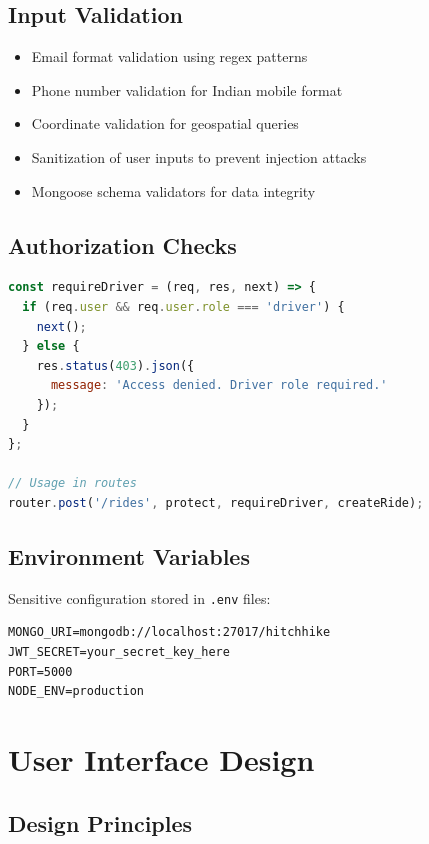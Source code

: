 \documentclass[12pt,a4paper]{article}
\begin{document}
\subsection{Input Validation}

\begin{itemize}
    \item Email format validation using regex patterns
    \item Phone number validation for Indian mobile format
    \item Coordinate validation for geospatial queries
    \item Sanitization of user inputs to prevent injection attacks
    \item Mongoose schema validators for data integrity
\end{itemize}

\subsection{Authorization Checks}

\begin{lstlisting}[language=JavaScript, caption=Role-Based Access Control]
const requireDriver = (req, res, next) => {
  if (req.user && req.user.role === 'driver') {
    next();
  } else {
    res.status(403).json({ 
      message: 'Access denied. Driver role required.' 
    });
  }
};

// Usage in routes
router.post('/rides', protect, requireDriver, createRide);
\end{lstlisting}

\subsection{Environment Variables}

Sensitive configuration stored in \texttt{.env} files:
\begin{lstlisting}
MONGO_URI=mongodb://localhost:27017/hitchhike
JWT_SECRET=your_secret_key_here
PORT=5000
NODE_ENV=production
\end{lstlisting}

\newpage

\section{User Interface Design}

\subsection{Design Principles}
\end{document}
